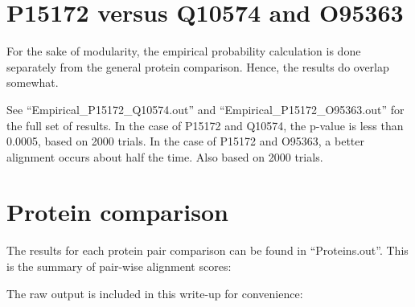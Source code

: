 \documentclass[a4paper, 12pt]{report}
\begin{document}
\section{P15172 versus Q10574 and O95363}
    For the sake of modularity, the empirical probability 
        calculation is done separately from the general protein comparison.
        Hence, the results do overlap somewhat.
        
    See ``Empirical\_P15172\_Q10574.out'' and ``Empirical\_P15172\_O95363.out'' for the full set of results.
    In the case of P15172 and Q10574, the p-value is less than 0.0005, based on 2000 trials.  
    In the case of P15172 and O95363, a better alignment occurs about half the time.  
    Also based on 2000 trials.
    
\section{Protein comparison}
    The results for each protein pair comparison can be found in ``Proteins.out''.
    This is the summary of pair-wise alignment scores:
    
    
    
    The raw output is included in this write-up for convenience:
    
\end{document}
